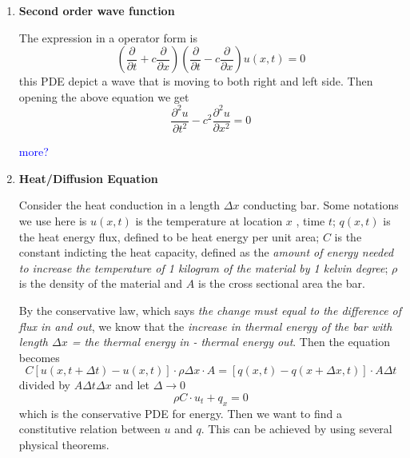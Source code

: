 \documentclass[10pt]{article}
\newenvironment{changemargin}[2]{%
  \begin{list}{}{%
    \setlength{\topsep}{0pt}%
    \setlength{\leftmargin}{#1}%
    \setlength{\rightmargin}{#2}%
    \setlength{\listparindent}{\parindent}%
    \setlength{\itemindent}{\parindent}%
    \setlength{\parsep}{\parskip}%
  }%
  \item[]}{\end{list}}
\begin{document}
\begin{changemargin}{-0.125in}{0in}
\begin{enumerate}
\begin{enumerate}
	            \bigskip
	            
	            \item \textbf{Second order wave function}
	            
	            \smallskip
	            
	            The expression in a operator form is
	            \[
	            (\frac{\partial}{\partial t} + c \frac{\partial }{\partial x})(\frac{\partial}{\partial t} - c\frac{\partial}{\partial x}) u(x,t) = 0
	            \]
	            this PDE depict a wave that is moving to both right and left side. Then opening the above equation we get 
	            \[
	            \frac{\partial^2 u}{\partial t^2} - c^2 \frac{\partial^2 u}{\partial x^2} = 0
	            \]
	            
	            \textcolor{blue}{more?}
	            
	            \medskip
	            
	            \item \textbf{Heat/Diffusion Equation}
	            
	            \smallskip
	            
	            Consider the heat conduction in a length $\Delta x$ conducting bar. Some notations we use here is $u(x,t)$ is the temperature at location $x$ , time $t$; $q(x,t)$ is the heat energy flux, defined to be heat energy per unit area; $C$ is the constant indicting the heat capacity, defined as the \textit{amount of energy needed to increase the temperature of 1 kilogram of the material by 1 kelvin degree}; $\rho$ is the density of the material and $A$ is the cross sectional area the bar.
	            
	                \medskip
	                
	                By the conservative law, which says \textit{the change must equal to the difference of flux in and out}, we know that the \textit{increase in thermal energy of the bar with length $\Delta x$  = the thermal energy in - thermal energy out}. Then the equation becomes 
	                \[
	                C[u(x, t + \Delta t) - u(x,t)] \cdot \rho \Delta x \cdot A = [q(x,t) - q(x + \Delta x, t)] \cdot A \Delta t
	                \]
	                divided by $A \Delta t \Delta x$ and let $\Delta \rightarrow 0$ 
	                \[
	                \rho C \cdot u_t + q_x = 0
	                \]
	                which is the conservative PDE for energy. Then we want to find a constitutive relation between $u$ and $q$. This can be achieved by using several physical theorems. 
	                \begin{enumerate}
	                

\end{enumerate}
\end{enumerate}
\end{enumerate}
\end{changemargin}
\end{document}
